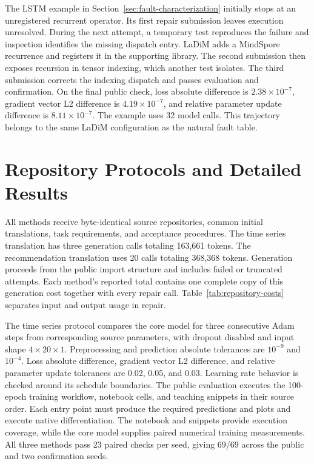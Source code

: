 The LSTM example in Section~\ref{sec:fault-characterization} initially stops at an unregistered recurrent operator. Its first repair submission leaves execution unresolved. During the next attempt, a temporary test reproduces the failure and inspection identifies the missing dispatch entry. LaDiM adds a MindSpore recurrence and registers it in the supporting library. The second submission then exposes recursion in tensor indexing, which another test isolates. The third submission corrects the indexing dispatch and passes evaluation and confirmation. On the final public check, loss absolute difference is $2.38\times10^{-7}$, gradient vector L2 difference is $4.19\times10^{-7}$, and relative parameter update difference is $8.11\times10^{-7}$. The example uses 32 model calls. This trajectory belongs to the same LaDiM configuration as the natural fault table.

\section{Repository Protocols and Detailed Results}
\label{sec:repository-results}

All methods receive byte-identical source repositories, common initial translations, task requirements, and acceptance procedures. The time series translation has three generation calls totaling 163,661 tokens. The recommendation translation uses 20 calls totaling 368,368 tokens. Generation proceeds from the public import structure and includes failed or truncated attempts. Each method's reported total contains one complete copy of this generation cost together with every repair call. Table~\ref{tab:repository-costs} separates input and output usage in repair.

\begin{table}[!htb]
\caption{Complete costs for the repository comparison. Total tokens include repair input and output plus common initial translation.}
\label{tab:repository-costs}
\centering
\small
\setlength{\tabcolsep}{3pt}

\end{table}

The time series protocol compares the core model for three consecutive Adam steps from corresponding source parameters, with dropout disabled and input shape $4\times20\times1$. Preprocessing and prediction absolute tolerances are $10^{-9}$ and $10^{-4}$. Loss absolute difference, gradient vector L2 difference, and relative parameter update tolerances are 0.02, 0.05, and 0.03. Learning rate behavior is checked around its schedule boundaries. The public evaluation executes the 100-epoch training workflow, notebook cells, and teaching snippets in their source order. Each entry point must produce the required predictions and plots and execute native differentiation. The notebook and snippets provide execution coverage, while the core model supplies paired numerical training measurements. All three methods pass 23 paired checks per seed, giving 69/69 across the public and two confirmation seeds.


